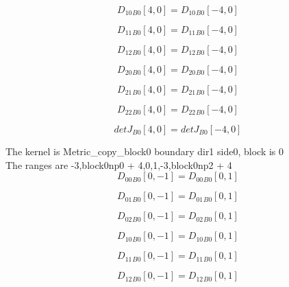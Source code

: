 \documentclass{article}
\begin{document}
\begin{dmath}{D_{10}{_{B0}}}[{4,0}] = {D_{10}{_{B0}}}[{-4,0}]\end{dmath}

\begin{dmath}{D_{11}{_{B0}}}[{4,0}] = {D_{11}{_{B0}}}[{-4,0}]\end{dmath}

\begin{dmath}{D_{12}{_{B0}}}[{4,0}] = {D_{12}{_{B0}}}[{-4,0}]\end{dmath}

\begin{dmath}{D_{20}{_{B0}}}[{4,0}] = {D_{20}{_{B0}}}[{-4,0}]\end{dmath}

\begin{dmath}{D_{21}{_{B0}}}[{4,0}] = {D_{21}{_{B0}}}[{-4,0}]\end{dmath}

\begin{dmath}{D_{22}{_{B0}}}[{4,0}] = {D_{22}{_{B0}}}[{-4,0}]\end{dmath}

\begin{dmath}{detJ{_{B0}}}[{4,0}] = {detJ{_{B0}}}[{-4,0}]\end{dmath}

\noindent The kernel is Metric_copy_block0 boundary dir1 side0, block is 0\\\noindent The ranges are -3,block0np0 + 4,0,1,-3,block0np2 + 4\\\begin{dmath}{D_{00}{_{B0}}}[{0,-1}] = {D_{00}{_{B0}}}[{0,1}]\end{dmath}

\begin{dmath}{D_{01}{_{B0}}}[{0,-1}] = {D_{01}{_{B0}}}[{0,1}]\end{dmath}

\begin{dmath}{D_{02}{_{B0}}}[{0,-1}] = {D_{02}{_{B0}}}[{0,1}]\end{dmath}

\begin{dmath}{D_{10}{_{B0}}}[{0,-1}] = {D_{10}{_{B0}}}[{0,1}]\end{dmath}

\begin{dmath}{D_{11}{_{B0}}}[{0,-1}] = {D_{11}{_{B0}}}[{0,1}]\end{dmath}

\begin{dmath}{D_{12}{_{B0}}}[{0,-1}] = {D_{12}{_{B0}}}[{0,1}]\end{dmath}
\end{document}
